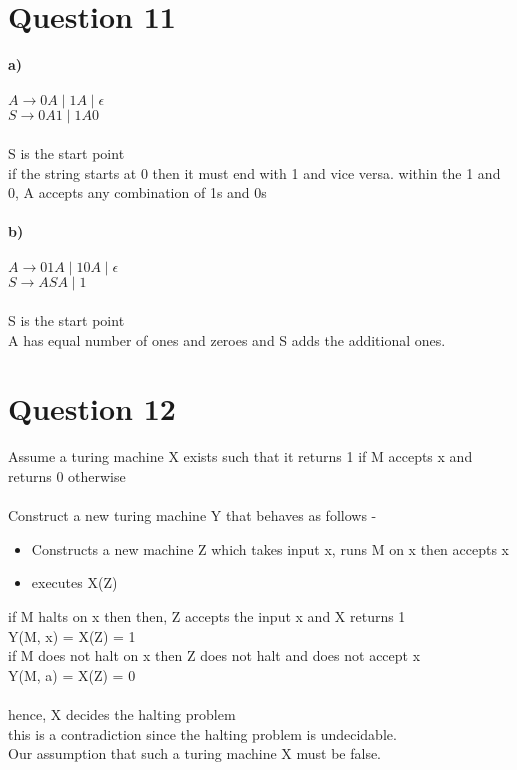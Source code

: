 \documentclass[11pt]{article}
\begin{document}
\section*{Question 11}
\textbf{a)} \\
\\
$A \rightarrow 0A \;|\; 1A \;|\; \epsilon $ \\
$S \rightarrow 0A1 \;|\; 1A0 $ \\
\\
S is the start point \\
if the string starts at 0 then it must end with 1 and vice versa.
within the 1 and 0, A accepts any combination of 1s and 0s \\
\\
\textbf{b)} \\
\\
$A \rightarrow 01A \;|\; 10A \;|\; \epsilon$ \\
$S \rightarrow ASA \;|\; 1$ \\
\\
S is the start point \\
A has equal number of ones and zeroes and S adds the additional ones.

\section*{Question 12}
Assume a turing machine X exists such that it returns 1 if M accepts x and returns 0
otherwise \\
\\
Construct a new turing machine Y that behaves as follows -
\begin{itemize}
    \item Constructs a new machine Z which takes input x, runs M on x then accepts x
    \item executes X(Z)
\end{itemize}
if M halts on x then then, Z accepts the input x and X returns 1 \\
Y(M, x) = X(Z) = 1 \\
if M does not halt on x then Z does not halt and does not accept x \\
Y(M, a) = X(Z) = 0 \\
\\
hence, X decides the halting problem \\
this is a contradiction since the halting problem is undecidable. \\
Our assumption that such a turing machine X must be false.
\end{document}
